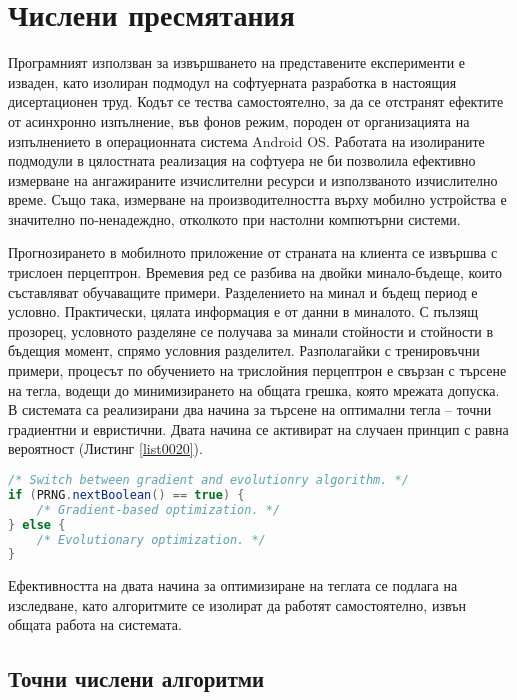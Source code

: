﻿\chapter{Числени пресмятания}

Програмният използван за извършването на представените експерименти е изваден, като изолиран подмодул на софтуерната разработка в настоящия дисертационен труд. Кодът се тества самостоятелно, за да се отстранят ефектите от асинхронно изпълнение, във фонов режим, породен от организацията на изпълнението в операционната система Android OS. Работата на изолираните подмодули в цялостната реализация на софтуера не би позволила ефективно измерване на ангажираните изчислителни ресурси и използваното изчислително време. Също така, измерване на производителността върху мобилно устройства е значително по-ненадеждно, отколкото при настолни компютърни системи. 

Прогнозирането в мобилното приложение от страната на клиента се извършва с трислоен перцептрон. Времевия ред се разбива на двойки минало-бъдеще, които съставляват обучаващите примери. Разделението на минал и бъдещ период е условно. Практически, цялата информация е от данни в миналото. С пълзящ прозорец, условното разделяне се получава за минали стойности и стойности в бъдещия момент, спрямо условния разделител. Разполагайки с тренировъчни примери, процесът по обучението на трислойния перцептрон е свързан с търсене на тегла, водещи до минимизирането на общата грешка, която мрежата допуска. В системата са реализирани два начина за търсене на оптимални тегла – точни градиентни и евристични. Двата начина се активират на случаен принцип с равна вероятност (Листинг \ref{list0020}).

\begin{lstlisting}[caption=Превключване на алгоритмите за обучение, language=Java, basicstyle=\tiny, label=list0020]
/* Switch between gradient and evolutionry algorithm. */
if (PRNG.nextBoolean() == true) {
	/* Gradient-based optimization. */
} else {
	/* Evolutionary optimization. */
}
\end{lstlisting}

Ефективността на двата начина за оптимизиране на теглата се подлага на изследване, като алгоритмите се изолират да работят самостоятелно, извън общата работа на системата. 

\section{Точни числени алгоритми}

